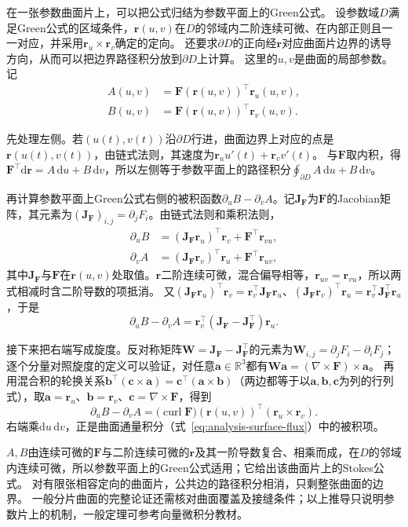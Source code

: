 在一张参数曲面片上，可以把公式归结为参数平面上的Green公式。
设参数域$D$满足Green公式的区域条件，$\bm r(u,v)$在$D$的邻域内二阶连续可微、在内部正则且一一对应，并采用$\bm r_u\times\bm r_v$确定的定向。
还要求$\partial D$的正向经$\bm r$对应曲面片边界的诱导方向，从而可以把边界路径积分放到$\partial D$上计算。
这里的$u,v$是曲面的局部参数。记
\[
 \begin{aligned}
 A(u,v)&=\bm F(\bm r(u,v))^\top\bm r_u(u,v),\\
 B(u,v)&=\bm F(\bm r(u,v))^\top\bm r_v(u,v).
 \end{aligned}
\]

先处理左侧。若$(u(t),v(t))$沿$\partial D$行进，曲面边界上对应的点是$\bm r(u(t),v(t))$，由链式法则，其速度为$\bm r_uu'(t)+\bm r_vv'(t)$。
与$\bm F$取内积，得$\bm F^\top\mathrm d\bm r=A\,\mathrm du+B\,\mathrm dv$，所以左侧等于参数平面上的路径积分$\oint_{\partial D}A\,\mathrm du+B\,\mathrm dv$。

再计算参数平面上Green公式右侧的被积函数$\partial_uB-\partial_vA$。记$\bm J_{\bm F}$为$\bm F$的Jacobian矩阵，其元素为$(\bm J_{\bm F})_{i,j}=\partial_jF_i$。由链式法则和乘积法则，
\[
 \begin{aligned}
 \partial_uB&=(\bm J_{\bm F}\bm r_u)^\top\bm r_v+\bm F^\top\bm r_{vu},\\
 \partial_vA&=(\bm J_{\bm F}\bm r_v)^\top\bm r_u+\bm F^\top\bm r_{uv},
 \end{aligned}
\]
其中$\bm J_{\bm F}$与$\bm F$在$\bm r(u,v)$处取值。$\bm r$二阶连续可微，混合偏导相等，$\bm r_{uv}=\bm r_{vu}$，所以两式相减时含二阶导数的项抵消。
又$(\bm J_{\bm F}\bm r_u)^\top\bm r_v=\bm r_v^\top\bm J_{\bm F}\bm r_u$、$(\bm J_{\bm F}\bm r_v)^\top\bm r_u=\bm r_v^\top\bm J_{\bm F}^\top\bm r_u$，于是
\[
 \partial_uB-\partial_vA=\bm r_v^\top(\bm J_{\bm F}-\bm J_{\bm F}^\top)\bm r_u.
\]

接下来把右端写成旋度。反对称矩阵$\bm W=\bm J_{\bm F}-\bm J_{\bm F}^\top$的元素为$\bm W_{i,j}=\partial_jF_i-\partial_iF_j$；逐个分量对照旋度的定义可以验证，对任意$\bm a\in\mathbb R^3$都有$\bm W\bm a=(\nabla\times\bm F)\times\bm a$。
再用混合积的轮换关系$\bm b^\top(\bm c\times\bm a)=\bm c^\top(\bm a\times\bm b)$（两边都等于以$\bm a,\bm b,\bm c$为列的行列式），取$\bm a=\bm r_u$、$\bm b=\bm r_v$、$\bm c=\nabla\times\bm F$，得到
\[
 \partial_uB-\partial_vA
 =\bigl(\operatorname{curl}\bm F\bigr)(\bm r(u,v))^\top
   (\bm r_u\times\bm r_v).
\]
右端乘$\mathrm du\,\mathrm dv$，正是曲面通量积分（式~\eqref{eq:analysis-surface-flux}）中的被积项。

$A,B$由连续可微的$\bm F$与二阶连续可微的$\bm r$及其一阶导数复合、相乘而成，在$D$的邻域内连续可微，所以参数平面上的Green公式适用；它给出该曲面片上的Stokes公式。
对有限张相容定向的曲面片，公共边的路径积分相消，只剩整张曲面的边界。
一般分片曲面的完整论证还需核对曲面覆盖及接缝条件；以上推导只说明参数片上的机制，一般定理可参考向量微积分教材。

